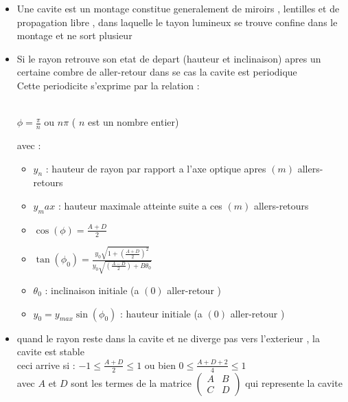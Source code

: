 \documentclass[12pt]{book}
\begin{document}
        \begin{itemize}
            \item Une cavite est un montage constitue generalement de miroirs , lentilles et de propagation libre , dans laquelle le tayon lumineux se trouve confine dans le montage et ne sort plusieur
            \item Si le rayon retrouve son etat de depart (hauteur et inclinaison) apres un certaine combre de aller-retour dans se cas la cavite est periodique \\
                  Cette periodicite s'exprime par la relation :
                  \begin{center}
                     \\
                    $\phi = \frac{\pi}{n}$ ou $n\pi$ ( $n$ est un nombre entier)
                  \end{center}
                  avec : 
                  \begin{itemize}
                    \item $y_n$ : hauteur de rayon par rapport a l'axe optique apres $(m)$ allers-retours
                    \item $y_max$ : hauteur maximale atteinte suite a ces $(m)$ allers-retours 
                    \item $\cos(\phi) = \frac{A+D}{2}$
                    \item $\tan(\phi_0) = \frac{y_0\sqrt{1+(\frac{A+D}{2})^2}}{y_0 \sqrt{(\frac{A-D}{2})+B\theta_0}}$
                    \item $\theta_0 $ : inclinaison initiale (a $(0)$ aller-retour ) 
                    \item $y_0 = y_{max}\sin(\phi_0) $ : hauteur initiale (a $(0)$ aller-retour ) 
                  \end{itemize}
            \item quand le rayon reste dans la cavite et ne diverge pas vers l'exterieur , la cavite est stable
             \\   ceci arrive si : $-1 \leq \frac{A+D}{2}\leq 1 $ ou bien $0 \leq \frac{A+D+2}{4}\leq 1 $ \\
             avec $A$ et $D$ sont les termes de la matrice 
             $\begin{pmatrix}
                A & B\\
                C & D
            \end{pmatrix}$
            qui represente la cavite 
        \end{itemize}
        \pagebreak
\end{document}
